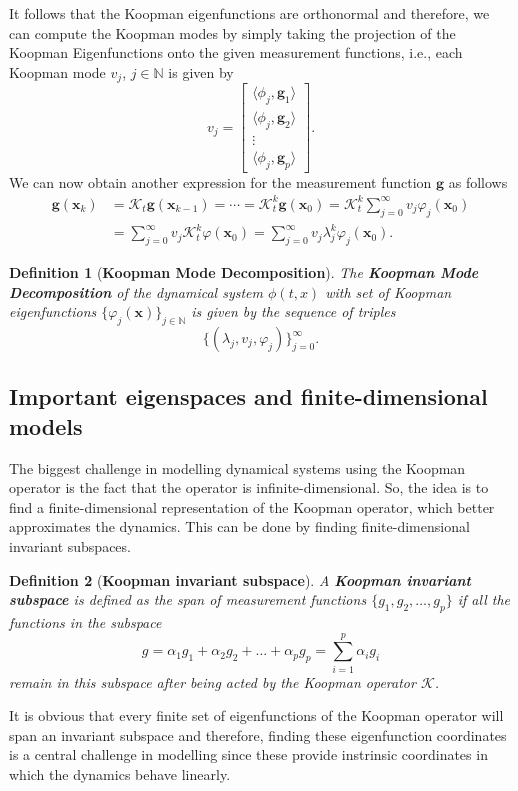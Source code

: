 \documentclass[]{article}
\newtheorem{definition}{Definition}
\begin{document}
It follows that the Koopman eigenfunctions are orthonormal and therefore, we can compute the Koopman modes by simply taking the projection of the Koopman Eigenfunctions onto the given measurement functions, i.e., each Koopman mode $v_j$, $j \in \mathbb{N}$ is given by
\begin{equation}
	v_j = \begin{bmatrix}
		\langle \phi_j, \textbf{g}_1 \rangle \\
		\langle \phi_j, \textbf{g}_2 \rangle \\
		\vdots \\
		\langle \phi_j, \textbf{g}_p \rangle
	\end{bmatrix}.
\end{equation}
We can now obtain another expression for the measurement function $\textbf{g}$ as follows
\begin{equation}
	\begin{split}
		\textbf{g}(\textbf{x}_k) & = \mathcal{K}_t \textbf{g}(\textbf{x}_{k-1}) = \cdots = \mathcal{K}_t^k\textbf{g}(\textbf{x}_0) = \mathcal{K}_t^k \sum_{j=0}^{\infty} v_j \varphi_j (\textbf{x}_0) \\ & =
		\sum_{j=0}^{\infty} v_j \mathcal{K}_t^k \varphi(\textbf{x}_0) = \sum_{j=0}^{\infty} v_j \lambda_j^k \varphi_j(\textbf{x}_0).
	\end{split}
\end{equation}
\begin{definition}[\textbf{Koopman Mode Decomposition}]
The \textbf{Koopman Mode Decomposition} of the dynamical system $\phi(t,x)$ with set of Koopman eigenfunctions $\{\varphi_j(\textbf{x})\}_{j \in \mathbb{N}}$ is given by the sequence of triples
\begin{equation}
	\{(\lambda_j, v_j, \varphi_j)\}_{j=0}^{\infty}.
\end{equation}
\end{definition}
\subsection{Important eigenspaces and finite-dimensional models}
The biggest challenge in modelling dynamical systems using the Koopman operator is the fact that the operator is infinite-dimensional. So, the idea is to find a finite-dimensional representation of the Koopman operator, which better approximates the dynamics. This can be done by finding finite-dimensional invariant subspaces.
\begin{definition}[\textbf{Koopman invariant subspace}] 
A \textbf{Koopman invariant subspace} is defined as the span of measurement functions $\{g_1,g_2,\dots,g_p\}$ if all the functions in the subspace 
\begin{equation}
	g = \alpha_1g_1+\alpha_2g_2+\dots+\alpha_pg_p = \sum_{i=1}^p \alpha_i g_i
\end{equation}
remain in this subspace after being acted by the Koopman operator $\mathcal{K}$.
\end{definition}
It is obvious that every finite set of eigenfunctions of the Koopman operator will span an invariant subspace and therefore, finding these eigenfunction coordinates is a central challenge in modelling since these provide instrinsic coordinates in which the dynamics behave linearly.
\end{document}
